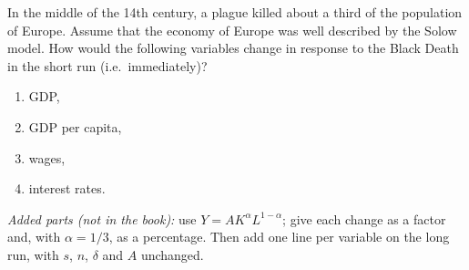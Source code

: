 \noindent In the middle of the 14th century, a plague killed about a third of the population of Europe. Assume that the economy of Europe
was well described by the Solow model. How would the following variables change in response to the Black Death in the short run
(i.e.\ immediately)?
\begin{enumerate}[label=(\alph*),leftmargin=2.2em,topsep=2pt,itemsep=1pt]
\item GDP,
\item GDP per capita,
\item wages,
\item interest rates.
\end{enumerate}
\noindent\textit{Added parts (not in the book):} use $Y=AK^{\alpha}L^{1-\alpha}$; give each change as a factor and, with $\alpha=1/3$, as a
percentage. Then add one line per variable on the long run, with $s$, $n$, $\delta$ and $A$ unchanged.
\resolespaco
